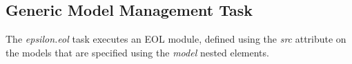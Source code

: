 \subsection{Generic Model Management Task}
\label{sec:EolTask}

The \emph{epsilon.eol} task executes an EOL module, defined using the \emph{src} attribute on the models that are specified using the \emph{model} nested elements.